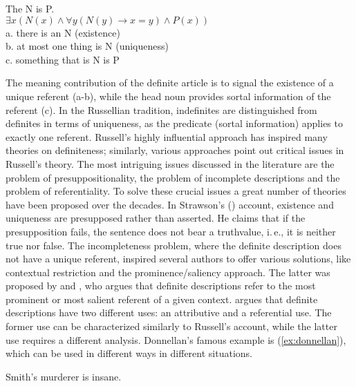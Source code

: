 \documentclass[output=paper]{langsci/langscibook}
\begin{document}
\begin{exe}
\ex\label{ex:russell}
The N is P. \\
$\exists x(N(x) \wedge \forall y(N(y) \rightarrow x=y) \wedge P(x))$ \\
a. there is an N (existence) \\
b. at most one thing is N (uniqueness) \\
c. something that is N is P
\end{exe}

\newpage
The meaning contribution of the definite article is to signal the existence of a unique referent (a-b), while the head noun provides sortal information of the referent (c). In the Russellian tradition, indefinites are distinguished from definites in terms of uniqueness, as the predicate (sortal information) applies to exactly one referent. Russell's highly influential approach has inspired many theories on definiteness; similarly, various approaches point out critical issues in Russell's theory.  The most intriguing issues discussed in the literature are the problem of presuppositionality, the problem of incomplete descriptions and the problem of referentiality. To solve these crucial issues a great number of theories have been proposed over the decades. In Strawson's (\citeyear{strawson:50}) account, existence and uniqueness are presupposed rather than asserted. He claims that if the presupposition fails, the sentence does not bear a truthvalue, i.\,e., it is neither true nor false. The incompleteness problem, where the definite description does not have a unique referent, inspired several authors \citep[e.\,g.,][]{strawson:50,mccawley:79,lewis:79,neale:90} to offer various solutions, like contextual restriction and the prominence/saliency approach. The latter was proposed by \citet{mccawley:79} and \citet{lewis:79}, who argues that definite descriptions refer to the most prominent or most salient referent of a given context. \citet{donnellan:66} argues that definite descriptions have two different uses: an attributive and a referential use. The former use can be characterized similarly to Russell's account, while the latter use requires a different analysis. Donnellan's famous example is (\ref{ex:donnellan}), which can be used in different ways in different situations. 

\begin{exe}
\ex\label{ex:donnellan}
Smith’s murderer is insane. \hfill\citep[][p.285]{donnellan:66}
\end{exe}
\end{document}
